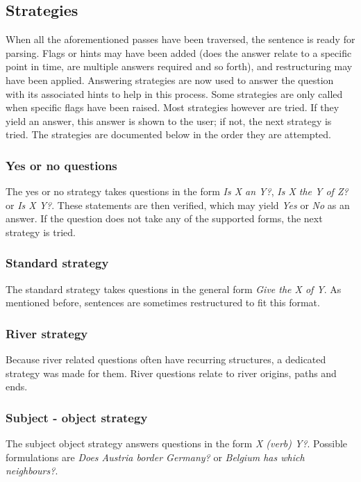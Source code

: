 \documentclass{article}
\begin{document}
\subsection{Strategies}
When all the aforementioned passes have been traversed, the sentence is ready for parsing. Flags or hints may have been added (does the answer relate to a specific point in time, are multiple answers required and so forth), and restructuring may have been applied. Answering strategies are now used to answer the question with its associated hints to help in this process. Some strategies are only called when specific flags have been raised. Most strategies however are tried. If they yield an answer, this answer is shown to the user; if not, the next strategy is tried. The strategies are documented below in the order they are attempted.

\subsubsection{Yes or no questions}
The yes or no strategy takes questions in the form \emph{Is X an Y?}, \emph{Is X the Y of Z?} or \emph{Is X Y?}. These statements are then verified, which may yield \emph{Yes} or \emph{No} as an answer. If the question does not take any of the supported forms, the next strategy is tried.

\subsubsection{Standard strategy}
The standard strategy takes questions in the general form \emph{Give the X of Y}. As mentioned before, sentences are sometimes restructured to fit this format.

\subsubsection{River strategy}
Because river related questions often have recurring structures, a dedicated strategy was made for them. River questions relate to river origins, paths and ends.

\subsubsection{Subject - object strategy}
The subject object strategy answers questions in the form \emph{X (verb) Y?}. Possible formulations are \emph{Does Austria border Germany?} or \emph{Belgium has which neighbours?}.
\end{document}
